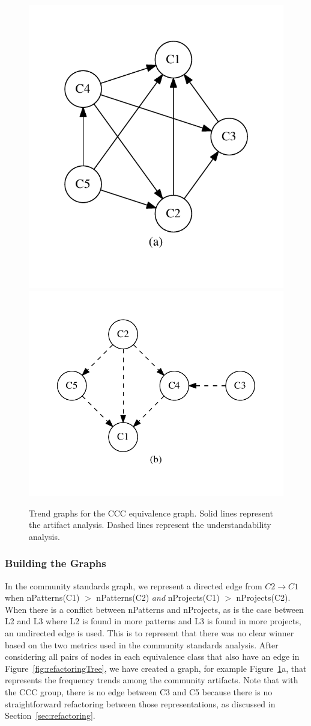 \begin{figure}[tb]
\centering
\includegraphics[width=0.42\columnwidth]{graphs/cart.pdf}\includegraphics[width=0.57\columnwidth]{graphs/ccom.pdf}
\caption{Trend graphs for the CCC equivalence graph. Solid lines represent the artifact analysis. Dashed lines represent the understandability analysis.}
\label{fig:graphsforanalysis}
\end{figure}

\subsubsection{Building the Graphs}
In the community standards graph, we represent a directed edge from $C2 \rightarrow C1$ when  nPatterns(C1) $>$ nPatterns(C2) \emph{and}  nProjects(C1) $>$ nProjects(C2).
When there is a conflict between nPatterns and nProjects, as is the case between L2 and L3 where L2 is found in more patterns and L3 is found in more projects, an undirected edge is used.
This is to represent that there was no clear winner based on the two metrics used in the community standards analysis.
After considering all pairs of nodes in each equivalence class that also have an edge in Figure~\ref{fig:refactoringTree}, we have created a graph, for example Figure~\ref{fig:graphsforanalysis}a, that represents the frequency trends among the community artifacts. Note that with the CCC group, there is no edge between C3 and C5 because there is no straightforward refactoring between those representations, as discussed in Section~\ref{sec:refactoring}.

